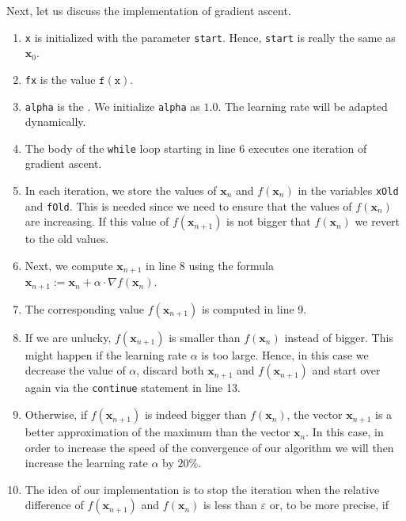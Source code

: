 Next, let us discuss the implementation of gradient ascent.
\begin{enumerate}
\item \texttt{x} is initialized with the parameter \texttt{start}.  Hence, \texttt{start} is really the same as
      $\mathbf{x}_0$. 
\item \texttt{fx} is the value $\texttt{f}(\texttt{x})$.
\item \texttt{alpha} is the .  We initialize \texttt{alpha} as $1.0$.  The learning rate
      will be adapted dynamically. 
\item The body of the \texttt{while} loop starting in line 6 executes one iteration of gradient ascent.
\item In each iteration, we store the values of $\mathbf{x}_n$ and $f(\mathbf{x}_n)$ in the variables
      \texttt{xOld} and \texttt{fOld}.  This is needed since we need to ensure that the values of
      $f(\mathbf{x}_n)$ are increasing.  If this value of $f(\mathbf{x}_{n+1})$ is not bigger that
      $f(\mathbf{x}_n)$ we revert to the old values.
\item Next, we compute $\mathbf{x}_{n+1}$ in line 8 using the formula
      \\[0.2cm]
      \hspace*{1.3cm}
      $\mathbf{x}_{n+1} := \mathbf{x}_n + \alpha \cdot \nabla f(\mathbf{x}_n)$.
\item The corresponding value $f(\mathbf{x}_{n+1})$ is computed in line 9.
\item If we are unlucky, $f(\mathbf{x}_{n+1})$ is smaller than $f(\mathbf{x}_{n})$ instead of bigger.  This might happen if the learning
      rate $\alpha$ is too large.  Hence, in this case we decrease the value of $\alpha$, discard 
      both $\mathbf{x}_{n+1}$ and $f(\mathbf{x}_{n+1})$ and start over again via the \texttt{continue}
      statement in line 13.
\item Otherwise, if  $f(\mathbf{x}_{n+1})$ is indeed bigger than $f(\mathbf{x}_{n})$, the vector
  $\mathbf{x}_{n+1}$ is a better approximation of the maximum than the vector $\mathbf{x}_n$.  
      In this case, in order to increase the speed of the convergence of our algorithm we will then increase the learning rate
      $\alpha$ by $20\%$.    
\item The idea of our implementation is to stop the iteration when the relative difference  of 
      $f(\mathbf{x}_{n+1})$ and $f(\mathbf{x}_{n})$ is less than $\varepsilon$ or, to be more precise, if
      \\[0.2cm]

\end{enumerate}
